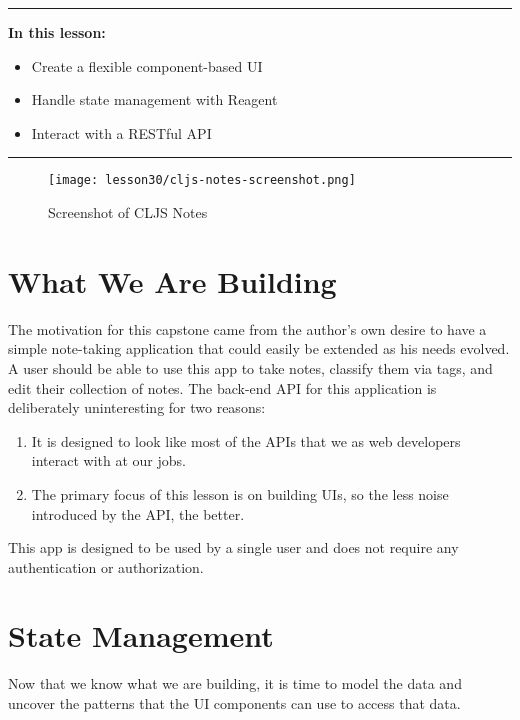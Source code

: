 \documentclass[10pt,twoside,openright]{memoir}
\begin{document}
\begin{center}\rule{0.5\linewidth}{0.5pt}\end{center}

\textbf{In this lesson:}

\begin{itemize}
\tightlist
\item
  Create a flexible component-based UI
\item
  Handle state management with Reagent
\item
  Interact with a RESTful API
\end{itemize}

\begin{center}\rule{0.5\linewidth}{0.5pt}\end{center}

\begin{figure}[H]
\caption{Screenshot of CLJS Notes}
\centering
\texttt{[image: lesson30/cljs-notes-screenshot.png]}
\end{figure}


\section{What We Are Building}

The motivation for this capstone came from the author's own desire to
have a simple note-taking application that could easily be extended as
his needs evolved. A user should be able to use this app to take notes,
classify them via tags, and edit their collection of notes. The back-end
API for this application is deliberately uninteresting for two reasons:

\begin{enumerate}
\def\labelenumi{\arabic{enumi}.}
\tightlist
\item
  It is designed to look like most of the APIs that we as web developers
  interact with at our jobs.
\item
  The primary focus of this lesson is on building UIs, so the less noise
  introduced by the API, the better.
\end{enumerate}

This app is designed to be used by a single user and does not require
any authentication or authorization.


\section{State Management}

Now that we know what we are building, it is time to model the data and
uncover the patterns that the UI components can use to access that data.
\end{document}
